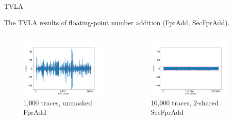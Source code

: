 \begin{frame}{TVLA}

The TVLA results of floating-point number addition (FprAdd, SecFprAdd).

\vskip -15pt
\begin{columns}[T]
\begin{figure}
\includegraphics[width=\textwidth]{figure/tvla-F4-CHES/fpr_add_1k.png}
\vspace{-20pt}
\caption{1,000 traces, unmasked FprAdd}
\end{figure}

\begin{figure}
\includegraphics[width=\textwidth]{figure/tvla-F4-CHES/SecFprAdd_2shares_10k.png}
\vspace{-20pt}
\caption{10,000 traces, 2-shared SecFprAdd}
\end{figure}


\end{columns}
\end{frame}
